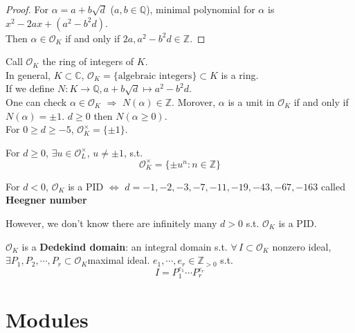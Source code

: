 \begin{proof}
    For  $ \alpha =a+b\sqrt{d} $ ($ a,b\in \mathbb{Q} $), minimal polynomial for  $ \alpha  $ is  $ x^2-2ax+(a^2-b^2d) $.\\
    Then  $ \alpha\in\mathcal{O}_K $ if and only if  $ 2a,a^2-b^2d\in \mathbb{Z} $.  
\end{proof}
Call  $ \mathcal{O}_K $ the ring of integers of  $ K  $. \\
In general,  $ K\subset \mathbb{C} $,  $ \mathcal{O}_K=\{\text{algebraic integers}\}\subset K $ is a ring.\\
If we define   $ N:K\rightarrow\mathbb{Q} , a+b\sqrt{d}\mapsto a^2-b^2d$.\\
One can check  $ \alpha\in \mathcal{O}_K$ $ \Rightarrow  $  $ N(\alpha )\in \mathbb{Z} $. Morover,  $ \alpha  $ is a unit in  $ \mathcal{O}_K $ if and only if  $ N(\alpha)=\pm 1 $. $ d \geq 0 $ then  $ N(\alpha  \geq 0) $.          \\
For  $ 0 \geq d \geq -5 $,  $ \mathcal{O}_K^\times=\{\pm 1\} $.\\
\begin{theorem}
    For  $ d \geq 0 $,  $ \exists u\in \mathcal{O}_L^\times $,  $ u\not=\pm 1 $, s.t.
    \[\mathcal{O}_K^\times=\{\pm u^n:n\in\mathbb{Z}\}\]     
\end{theorem}
\begin{theorem}
    For  $ d<0 $,  $ \mathcal{O}_K $ is a PID  $ \Leftrightarrow $  $ d=-1,-2,-3,-7,-11,-19,-43,-67,-163 $ called \textbf{Heegner number}    
\end{theorem}
However, we don't know there are infinitely many  $ d>0  $ s.t.  $ \mathcal{O}_K $ is a PID.
\begin{proposition}
     $ \mathcal{O}_K $ is a \textbf{Dedekind domain}: an integral domain s.t.  $ \forall  \, I\subset \mathcal{O}_K $ nonzero ideal,  $ \exists P_1,P_2,\cdots,P_r\subset \mathcal{O}_K $maximal ideal.  $ e_1,\cdots,e_r\in\mathbb{Z}_{>0}  $  s.t.
     \[I=P_1^{e_1}\cdots P_r^{e_r}\] 
\end{proposition}
\section{Modules}
